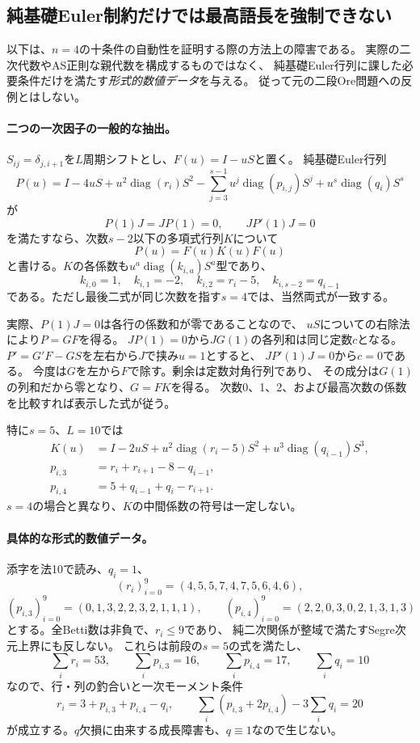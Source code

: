 \documentclass[11pt,a4paper]{ltjsarticle}
\begin{document}
\subsection{純基礎Euler制約だけでは最高語長を強制できない}
\label{note:n4-pure-euler-obstruction}
以下は、$n=4$の十条件の自動性を証明する際の方法上の障害である。
実際の二次代数やAS正則な親代数を構成するものではなく、
純基礎Euler行列に課した必要条件だけを満たす\emph{形式的数値データ}を与える。
従って元の二段Ore問題への反例とはしない。

\paragraph{二つの一次因子の一般的な抽出。}
$S_{ij}=\delta_{j,i+1}$を$L$周期シフトとし、$F(u)=I-uS$と置く。
純基礎Euler行列
\[
P(u)=I-4uS+u^2\operatorname{diag}(r_i)S^2
-\sum_{j=3}^{s-1}u^j\operatorname{diag}(p_{i,j})S^j
+u^s\operatorname{diag}(q_i)S^s
\]
が
\[
P(1)J=JP(1)=0,\qquad JP'(1)J=0
\]
を満たすなら、次数$s-2$以下の多項式行列$K$について
\begin{equation}\label{note:eq:n4-general-fkf}
P(u)=F(u)K(u)F(u)
\end{equation}
と書ける。$K$の各係数も$u^a\operatorname{diag}(k_{i,a})S^a$型であり、
\[
k_{i,0}=1,\quad k_{i,1}=-2,\quad
k_{i,2}=r_i-5,\quad k_{i,s-2}=q_{i-1}
\]
である。ただし最後二式が同じ次数を指す$s=4$では、当然両式が一致する。

実際、$P(1)J=0$は各行の係数和が零であることなので、
$uS$についての右除法により$P=GF$を得る。
$JP(1)=0$から$JG(1)$の各列和は同じ定数$c$となる。
$P'=G'F-GS$を左右から$J$で挟み$u=1$とすると、
$JP'(1)J=0$から$c=0$である。
今度は$G$を左から$F$で除す。剰余は定数対角行列であり、
その成分は$G(1)$の列和だから零となり、$G=FK$を得る。
次数0、1、2、および最高次数の係数を比較すれば表示した式が従う。

特に$s=5$、$L=10$では
\begin{align*}
K(u)&=I-2uS+u^2\operatorname{diag}(r_i-5)S^2
       +u^3\operatorname{diag}(q_{i-1})S^3,\\
p_{i,3}&=r_i+r_{i+1}-8-q_{i-1},\\
p_{i,4}&=5+q_{i-1}+q_i-r_{i+1}.
\end{align*}
$s=4$の場合と異なり、$K$の中間係数の符号は一定しない。

\paragraph{具体的な形式的数値データ。}
添字を法10で読み、$q_i=1$、
\[
(r_i)_{i=0}^9=(4,5,5,7,4,7,5,6,4,6),
\]
\[
(p_{i,3})_{i=0}^9=(0,1,3,2,2,3,2,1,1,1),\qquad
(p_{i,4})_{i=0}^9=(2,2,0,3,0,2,1,3,1,3)
\]
とする。全Betti数は非負で、$r_i\le9$であり、
純二次関係が整域で満たすSegre次元上界にも反しない。
これらは前段の$s=5$の式を満たし、
\[
\sum_i r_i=53,\qquad \sum_i p_{i,3}=16,\qquad
\sum_i p_{i,4}=17,\qquad \sum_iq_i=10
\]
なので、行・列の釣合いと一次モーメント条件
\[
r_i=3+p_{i,3}+p_{i,4}-q_i,\qquad
\sum_i(p_{i,3}+2p_{i,4})-3\sum_iq_i=20
\]
が成立する。$q$欠損に由来する成長障害も、$q\equiv1$なので生じない。
\end{document}
